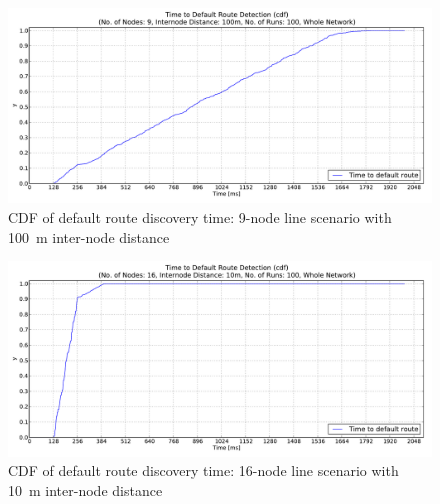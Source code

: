 \begin{figure}[htpb]
  \begin{center}
    \leavevmode
      \includegraphics[scale=0.38]
      {Pics/results/9/MRHOF/line/dist100_montecarlo_cdf_hist.pdf}
   \caption{CDF of default route discovery time: 9-node line scenario with 100~m inter-node distance}
   \label{fig:9_MRHOF_line100_cdf}
  \end{center}
\end{figure}


\begin{figure}[htpb]
  \begin{center}
    \leavevmode
      \includegraphics[scale=0.38]
      {Pics/results/16/MRHOF/line/dist10_montecarlo_cdf_hist.pdf}
   \caption{CDF of default route discovery time: 16-node line scenario with 10~m inter-node distance}
   \label{fig:16_MRHOF_line_10_cdf}
  \end{center}
\end{figure}

